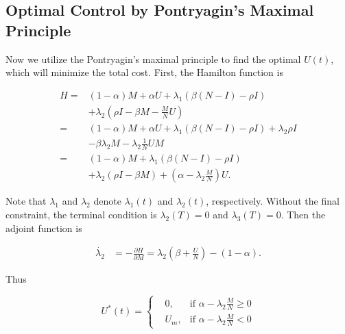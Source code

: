 \subsection{Optimal Control by Pontryagin's Maximal Principle}
Now we utilize the Pontryagin's maximal principle to find the optimal $U(t)$, which will minimize the total cost.
First, the Hamilton function is
\begin{small}
\begin{equation}
\nonumber
\begin{aligned}
H =& (1-\alpha) M + \alpha U + \lambda_{1} (\beta (N-I) - \rho I) \\
& + \lambda_{2} (\rho I  - \beta M - \frac{M}{N} U) \\
=& (1-\alpha) M + \alpha U + \lambda_{1} (\beta (N-I) - \rho I) + \lambda_{2} \rho I\\
& - \beta \lambda_{2} M - \lambda_{2} \frac{1}{N} U M \\
=& (1-\alpha) M + \lambda_{1} (\beta (N-I) - \rho I) \\
& + \lambda_{2} (\rho I  - \beta M) + ( \alpha - \lambda_{2} \frac{M}{N}) U.
\end{aligned}
\end{equation}
\end{small}
Note that $\lambda_{1}$ and $\lambda_{2}$ denote $\lambda_{1}(t)$ and $\lambda_{2}(t)$, respectively.
Without the final constraint, the terminal condition is $\lambda_{2}(T) = 0$ and $\lambda_{3}(T) = 0$.
Then the adjoint function is
\begin{small}
\begin{equation}
\nonumber
\begin{aligned}
\dot{\lambda_{2}} &= - \frac{ \partial H}{ \partial M} = \lambda_{2} (\beta + \frac{U}{N} ) - (1-\alpha).
\end{aligned}
\end{equation}
\end{small}

Thus
\begin{small}
\begin{equation}
\label{eq:opt_U}
U^{*}(t) =
\left\{
\begin{aligned}
&0,      & \text{if }  \alpha - \lambda_{2} \frac{M}{N} \ge 0 \\
&U_{m},        & \text{if } \alpha - \lambda_{2} \frac{M}{N} < 0
\end{aligned}
\right.
\end{equation}
\end{small}

